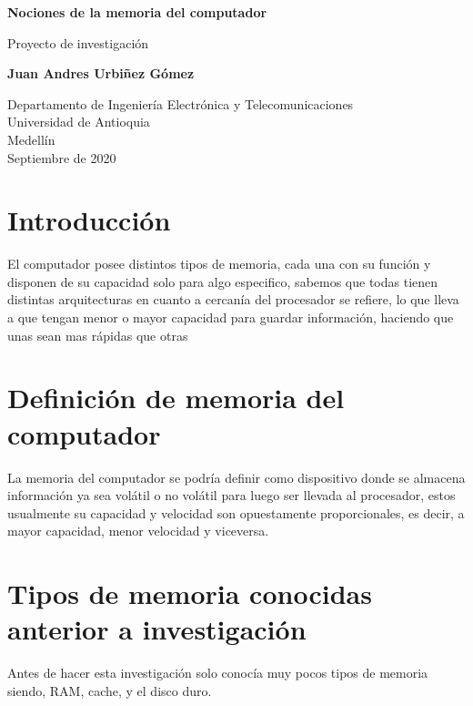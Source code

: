\documentclass{article}
\begin{document}
\begin{titlepage}
    \begin{center}
        \vspace*{1cm}
            
        \Huge
        \textbf{Nociones de la memoria del computador}
            
        \vspace{0.5cm}
        \LARGE
        Proyecto de investigación
            
        \vspace{1.5cm}
            
        \textbf{Juan Andres Urbiñez Gómez}
            
        \vfill
            
        \vspace{0.8cm}
            
        \Large
        Departamento de Ingeniería Electrónica y Telecomunicaciones\\
        Universidad de Antioquia\\
        Medellín\\
        Septiembre de 2020
            
    \end{center}
\end{titlepage}

\tableofcontents
\newpage

\section{Introducción}
El computador posee distintos tipos de memoria, cada una con su función y disponen de su capacidad solo para algo especifico, sabemos que todas tienen distintas arquitecturas en cuanto a cercanía del procesador se refiere, lo que lleva a que tengan menor o mayor capacidad para guardar información, haciendo que unas sean mas rápidas que otras 
\section{Definición de memoria del computador}
La memoria del computador se podría definir \cite{Augusto} como dispositivo donde se almacena información ya sea volátil o no volátil para luego ser llevada al procesador, estos usualmente su capacidad y velocidad son opuestamente proporcionales, es decir, a mayor capacidad, menor velocidad y viceversa.
\section{Tipos de memoria conocidas anterior a investigación} 
Antes de hacer esta investigación solo conocía muy pocos tipos de memoria siendo, RAM, cache, y el disco duro.
\end{document}
